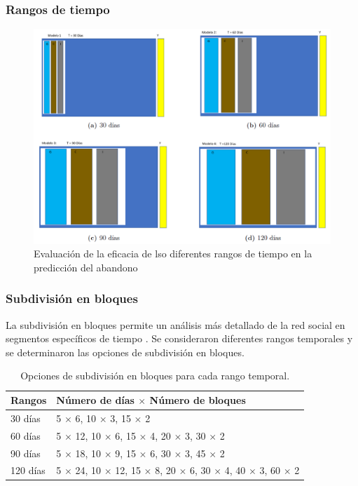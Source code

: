 \documentclass{beamer}
\begin{document}
\begin{frame}
	\frametitle{Rangos de tiempo}
	\begin{figure}
		\centering
		\includegraphics[width=0.7\linewidth]{figs/fig1}
		\caption{Evaluación de la eficacia de lso diferentes rangos de tiempo en la predicción del abandono}
		\label{fig:fig1}
	\end{figure}
\end{frame}


\begin{frame}
	\frametitle{Subdivisión en bloques}
	La subdivisión en bloques permite un análisis más detallado de la red social en segmentos específicos de tiempo \citet{kim2012a}. Se consideraron diferentes rangos temporales y se determinaron las opciones de subdivisión en bloques. 
	\begin{table}[H]
		\centering
		\begin{tabular}{ll}
			\toprule
			Rangos & Número de días $\times$ Número de bloques \\
			\midrule
			30 días & 5 $\times$ 6, 10 $\times$ 3, 15 $\times$ 2 \\
			60 días & 5 $\times$ 12, 10 $\times$ 6, 15 $\times$ 4, 20 $\times$ 3, 30 $\times$ 2 \\
			90 días & 5 $\times$ 18, 10 $\times$ 9, 15 $\times$ 6, 30 $\times$ 3, 45 $\times$ 2 \\
			120 días & 5 $\times$ 24, 10 $\times$ 12, 15 $\times$ 8, 20 $\times$ 6, 30 $\times$ 4, 40 $\times$ 3, 60 $\times$ 2 \\
			\bottomrule
		\end{tabular}
		\caption{Opciones de subdivisión en bloques para cada rango temporal.}
		
		\label{tab:subdivision-bloques1}
	\end{table}

\end{frame}
\end{document}
